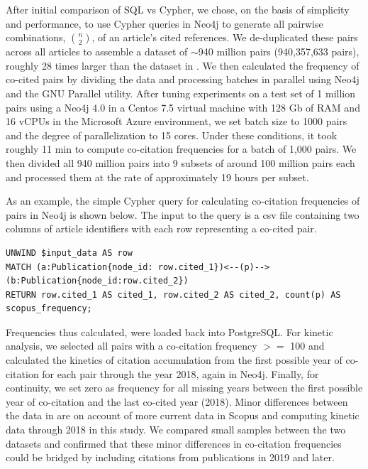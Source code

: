\documentclass[utf8]{frontiersSCNS}
\begin{document}
After initial comparison of SQL vs Cypher, we chose, on the basis of simplicity and performance, to use Cypher queries in Neo4j to generate all pairwise combinations, $n\choose 2$, of an article's cited references. We de-duplicated these pairs across all articles to assemble a dataset of $\sim$940 million pairs (940,357,633 pairs), roughly 28 times larger than the dataset in \cite{devarakonda_2020}. We then calculated the frequency of co-cited pairs by dividing the data and processing batches in parallel using Neo4j and the GNU Parallel utility.  After tuning experiments on a test set of 1 million pairs using a Neo4j 4.0 in a Centos 7.5 virtual machine with 128 Gb of RAM and 16 vCPUs in the Microsoft Azure environment, we set batch size to 1000 pairs and the degree of parallelization to 15 cores. Under these conditions, it took roughly 11 min to compute co-citation frequencies for a batch of 1,000 pairs. We then divided all 940 million pairs into 9 subsets of around 100 million pairs each and processed them at the rate of approximately 19 hours per subset.  

As an example, the simple Cypher query for calculating co-citation frequencies of pairs in Neo4j is shown below. The input to the query is a csv file containing two columns of article identifiers with each row representing a co-cited pair.  
\vspace{2 mm}
\lstset{language=Pascal, basicstyle=\footnotesize} 
\begin{lstlisting}[frame=single]
UNWIND $input_data AS row
MATCH (a:Publication{node_id: row.cited_1})<--(p)-->(b:Publication{node_id:row.cited_2})
RETURN row.cited_1 AS cited_1, row.cited_2 AS cited_2, count(p) AS scopus_frequency;
\end{lstlisting}

Frequencies thus calculated, were loaded back into PostgreSQL. For kinetic analysis, we selected all pairs with a co-citation frequency $>=$ 100 and calculated the kinetics of citation accumulation from the first possible year of co-citation for each pair through the year 2018, again in Neo4j.  Finally, for continuity, we set zero as frequency for all missing years between the first possible year of co-citation and the last co-cited year (2018). Minor differences between the data in  \cite{devarakonda_2020} are on account of more current data in Scopus and computing kinetic data through 2018 in this study. We compared small samples between the two datasets and confirmed that these minor differences in co-citation frequencies could be bridged by including citations from publications in 2019 and later. 
\end{document}
